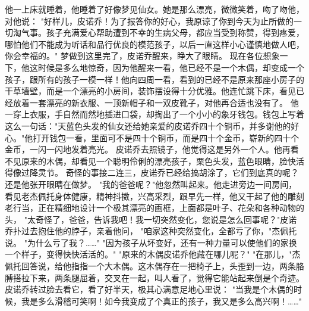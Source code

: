 \documentclass[12pt,UTF8]{ctexbook}
\begin{document}
他一上床就睡着，他睡着了好像梦见仙女。她是那么漂亮，微微笑着，吻了吻他，对他说：
"好样儿，皮诺乔！为了报答你的好心，我原谅了你到今天为止所做的一切淘气事。孩子充满爱心帮助遭到不幸的生病父母，都应当受到称赞，得到疼爱，哪怕他们不能成为听话和品行优良的模范孩子，以后一直这样小心谨慎地做人吧，你会幸福的。"
梦做到这里完了，皮诺乔醒来，睁大了眼睛。
现在各位想象一下，他这时候是多么地惊奇，因为他醒来一看，他已经不是一个木偶，却变成一个孩子，跟所有的孩子一模一样！他向四周一看，看到的已经不是原来那座小房子的干草墙壁，而是一个漂亮的小房间，装饰摆设得十分优雅。他连忙跳下床，看见已经放着一套漂亮的新衣服、一顶新帽子和一双皮靴子，对他再合适也没有了。
他一穿上衣服，手自然而然地插进口袋，却掏出了一个小小的象牙钱包。钱包上写着这么一句话："天蓝色头发的仙女还给她亲爱的皮诺乔四十个铜币，并多谢他的好心。"他打开钱包一看，里面可不是四十个铜币，而是四十个金币，崭新的四十个金币，一闪一闪地发着亮光。
皮诺乔去照镜子，他觉得这是另外一个人。他再看不见原来的木偶，却看见一个聪明伶俐的漂亮孩子，栗色头发，蓝色眼睛，脸快活得像过降灵节。
奇怪的事接二连三，皮诺乔已经给搞胡涂了，它们到底真的呢？还是他张开眼睛在做梦。
"我的爸爸呢？"他忽然叫起来。他走进旁边一间房间，看见老杰佩托身体健康，精神抖擞，兴高采烈，跟早先一样，他又干起了他的雕刻老行当，正在精细地设计一个极其漂亮的画框，上面都是叶子、花朵和各种动物的头，
"太奇怪了，爸爸，告诉我吧！我一切突然变化，您说是怎么回事呢？"皮诺乔扑过去抱住他的脖子，亲着他问，
"咱家这种突然变化，全都亏了你，"杰佩托说。
"为什么亏了我？……"
"因为孩子从坏变好，还有一种力量可以使他们的家换一个样子，变得快快活活的。"
"原来的木偶皮诺乔他藏在哪儿呢？"
"在那儿，"杰佩托回答说，给他指指一个大木偶。这木偶存在一把椅子上，头歪到一边，两条胳膊搭拉下来，两条腿屈着，交叉在一起，叫人看了，觉得它能站起来倒是个奇迹。
皮诺乔转过脸去看它，看了好半天，极其心满意足地心里说：
"当我是个木偶的时候，我是多么滑稽可笑啊！如今我变成了个真正的孩子，我又是多么高兴啊！……"

\backmatter
\end{document}
